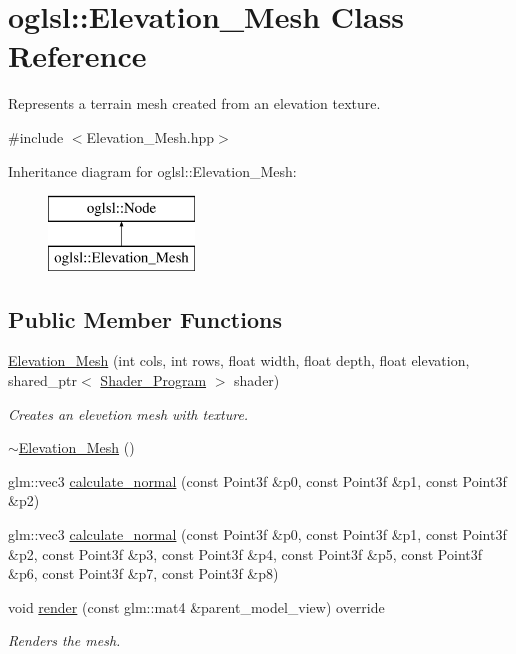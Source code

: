 \hypertarget{classoglsl_1_1_elevation___mesh}{}\section{oglsl\+:\+:Elevation\+\_\+\+Mesh Class Reference}
\label{classoglsl_1_1_elevation___mesh}


Represents a terrain mesh created from an elevation texture.  




{\ttfamily \#include $<$Elevation\+\_\+\+Mesh.\+hpp$>$}

Inheritance diagram for oglsl\+:\+:Elevation\+\_\+\+Mesh\+:\begin{figure}[H]
\begin{center}
\leavevmode
\includegraphics[height=2.000000cm]{classoglsl_1_1_elevation___mesh}
\end{center}
\end{figure}
\subsection*{Public Member Functions}
\begin{DoxyCompactItemize}
\item 
\mbox{\hyperlink{classoglsl_1_1_elevation___mesh_ab23733c3bcec54943bb012c272a44ca3}{Elevation\+\_\+\+Mesh}} (int cols, int rows, float width, float depth, float elevation, shared\+\_\+ptr$<$ \mbox{\hyperlink{classoglsl_1_1_shader___program}{Shader\+\_\+\+Program}} $>$ shader)
\begin{DoxyCompactList}\small\item\em Creates an elevetion mesh with texture. \end{DoxyCompactList}\item 
\mbox{\hyperlink{classoglsl_1_1_elevation___mesh_afc3f5227d96a854e9e66723fbf728cb2}{$\sim$\+Elevation\+\_\+\+Mesh}} ()
\item 
glm\+::vec3 \mbox{\hyperlink{classoglsl_1_1_elevation___mesh_ad141ee161715d896f41ca7b31b9d0c7d}{calculate\+\_\+normal}} (const Point3f \&p0, const Point3f \&p1, const Point3f \&p2)
\item 
glm\+::vec3 \mbox{\hyperlink{classoglsl_1_1_elevation___mesh_a768320a6bdacdeff34528c0c08f92b5c}{calculate\+\_\+normal}} (const Point3f \&p0, const Point3f \&p1, const Point3f \&p2, const Point3f \&p3, const Point3f \&p4, const Point3f \&p5, const Point3f \&p6, const Point3f \&p7, const Point3f \&p8)
\item 
void \mbox{\hyperlink{classoglsl_1_1_elevation___mesh_afb39dc1633680dccabb4b8da72ac4733}{render}} (const glm\+::mat4 \&parent\+\_\+model\+\_\+view) override
\begin{DoxyCompactList}\small\item\em Renders the mesh. \end{DoxyCompactList}\end{DoxyCompactItemize}
